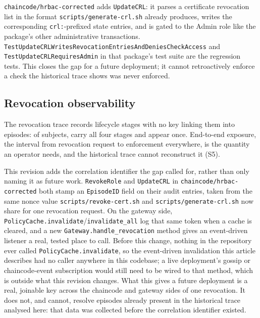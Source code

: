 \documentclass[a4paper,fleqn]{cas-sc}
\begin{document}
\texttt{chaincode/hrbac-corrected} adds \texttt{UpdateCRL}: it parses a
certificate revocation list in the format
\texttt{scripts/generate-crl.sh} already produces, writes the
corresponding \texttt{crl:}-prefixed state entries, and is gated to the
Admin role like the package's other administrative transactions.
\texttt{TestUpdateCRLWrites\-RevocationEntries\-AndDeniesCheckAccess} and
\texttt{TestUpdateCRLRequiresAdmin} in that package's test suite are the
regression tests. This closes the gap for a future deployment; it cannot
retroactively enforce a check the historical trace shows was never
enforced.

\subsection{Revocation observability}
\label{subsec:pm_revocation}

The revocation trace records lifecycle stages with no key linking them
into episodes: of \RevSubjects{} subjects, \RevComplete{} carry all four
stages and \RevSingleStage{} appear once. End-to-end exposure, the
interval from revocation request to enforcement everywhere, is the
quantity an operator needs, and the historical trace cannot reconstruct it
(S5).

This revision adds the correlation identifier the gap called for, rather
than only naming it as future work. \texttt{RevokeRole} and
\texttt{UpdateCRL} in \texttt{chaincode/hrbac-corrected} both stamp an
\texttt{EpisodeID} field on their audit entries, taken from the same nonce
value \texttt{scripts/revoke-cert.sh} and \texttt{scripts/generate-crl.sh}
now share for one revocation request. On the gateway side,
\texttt{PolicyCache.invalidate}/\texttt{invalidate\_all} log that same
token when a cache is cleared, and a new \texttt{Gateway.handle\_revocation}
method gives an event-driven listener a real, tested place to call. Before
this change, nothing in the repository ever called
\texttt{PolicyCache.invalidate}, so the event-driven invalidation this
article describes had no caller anywhere in this codebase; a live
deployment's gossip or chaincode-event subscription would still need to be
wired to that method, which is outside what this revision changes. What
this gives a future deployment is a real, joinable key across the
chaincode and gateway sides of one revocation. It does not, and cannot,
resolve episodes already present in the historical trace analysed here:
that data was collected before the correlation identifier existed.
\end{document}

